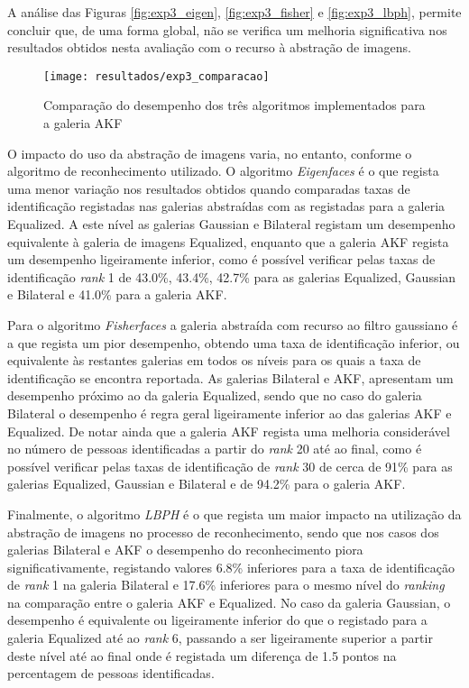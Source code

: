 A análise das Figuras \ref{fig:exp3_eigen}, \ref{fig:exp3_fisher} e \ref{fig:exp3_lbph}, permite concluir que, de uma forma global, não se verifica um melhoria significativa nos resultados obtidos nesta avaliação com o recurso à abstração de imagens. 

\begin{figure}[t]
  \begin{center}
    \leavevmode
    \texttt{[image: resultados/exp3\_comparacao]}
    \caption{Comparação do desempenho dos três algoritmos implementados para a galeria AKF}
    \label{fig:exp3_comaparacao}
  \end{center}
\end{figure}

O impacto do uso da abstração de imagens varia, no entanto, conforme o algoritmo de reconhecimento utilizado. O algoritmo \textit{Eigenfaces} é o que regista uma menor variação nos resultados obtidos quando comparadas taxas de identificação registadas nas galerias abstraídas com as registadas para a galeria Equalized. A este nível as galerias Gaussian e Bilateral registam um desempenho equivalente à galeria de imagens Equalized, enquanto que a galeria AKF regista um desempenho ligeiramente inferior, como é possível verificar pelas taxas de identificação \textit{rank} 1 de 43.0\%, 43.4\%, 42.7\% para as galerias Equalized, Gaussian e Bilateral e 41.0\% para a galeria AKF.

Para o algoritmo \textit{Fisherfaces} a galeria abstraída com recurso ao filtro gaussiano é a que regista um pior desempenho, obtendo uma taxa de identificação inferior, ou equivalente às restantes galerias em todos os níveis para os quais a taxa de identificação se encontra reportada. As galerias Bilateral e AKF, apresentam um desempenho próximo ao da galeria Equalized, sendo que no caso do galeria Bilateral o desempenho é regra geral ligeiramente inferior ao das galerias AKF e Equalized. De notar ainda que a galeria AKF regista uma melhoria considerável no número de pessoas identificadas a partir do \textit{rank} 20 até ao final, como é possível verificar pelas taxas de identificação de \textit{rank} 30 de cerca de 91\% para as galerias Equalized, Gaussian e Bilateral e de 94.2\% para o galeria AKF.

Finalmente, o algoritmo \textit{LBPH} é o que regista um maior impacto na utilização da abstração de imagens no processo de reconhecimento, sendo que nos casos dos galerias Bilateral e AKF o desempenho do reconhecimento piora significativamente, registando valores 6.8\% inferiores para a taxa de identificação de \textit{rank} 1 na galeria Bilateral e 17.6\% inferiores para o mesmo nível do \textit{ranking} na comparação entre o galeria AKF e Equalized. No caso da galeria Gaussian, o desempenho é equivalente ou ligeiramente inferior do que o registado para a galeria Equalized até ao \textit{rank} 6, passando a ser ligeiramente superior a partir deste nível até ao final onde é registada um diferença de 1.5 pontos na percentagem de pessoas identificadas.

